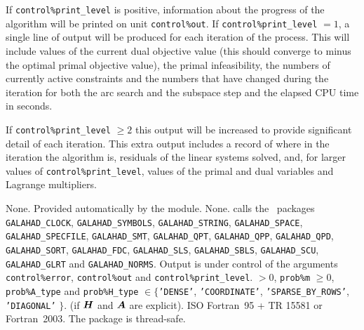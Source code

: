 \documentclass{galahad}
\newcommand{\packagename}{DQP}
\begin{document}
\galinfo
If {\tt control\%print\_level} is positive, information about the progress
of the algorithm will be printed on unit {\tt control\-\%out}.
If {\tt control\%print\_level} $= 1$, a single line of output will be produced
for each iteration of the process.
This will include values of the current dual objective value (this should
converge to minus the optimal primal objective value), the
primal infeasibility, the numbers of currently active constraints and the
numbers that have changed during the iteration for both the arc search and
the subspace step and the elapsed CPU time in seconds.

If {\tt control\%print\_level} $\geq 2$ this
output will be increased to provide significant detail of each iteration.
This extra output includes a record of where in the iteration the algorithm is,
residuals of the linear systems solved, and,
for larger values of {\tt control\%print\_level}, values of the primal and dual
variables and Lagrange multipliers.


\galgeneral

\galcommon None.
\galworkspace Provided automatically by the module.
\galroutines None.
\galmodules {\tt \packagename\_solve} calls the \galahad\ packages
{\tt GALAHAD\_CLOCK},
{\tt GALAHAD\_SY\-M\-BOLS},
{\tt GAL\-AHAD\-\_STRING},
{\tt GALAHAD\-\_SPACE},
{\tt GALAHAD\_SPECFILE},
{\tt GALAHAD\_SMT},
{\tt GALAHAD\_QPT},
{\tt GALAHAD\_QPP},
{\tt GALAHAD\_\-QPD},
{\tt GAL\-AHAD\_\-SORT},
{\tt GALAHAD\_\-FDC},
{\tt GALAHAD\_\-SLS},
{\tt GALAHAD\_\-SBLS},
{\tt GALAHAD\_\-SCU},
{\tt GALAHAD\-\_\-GLRT}
and
{\tt GALAHAD\-\_\-NORMS}.
\galio Output is under control of the arguments
 {\tt control\%error}, {\tt control\%out} and {\tt control\%print\_level}.
 $> 0$, {\tt prob\%m} $\geq  0$,
{\tt prob\%A\_type} and {\tt prob\%H\_type} $\in \{${\tt 'DENSE'},
 {\tt 'COORDINATE'}, {\tt 'SPARSE\_BY\_\-ROWS'}, {\tt 'DIAGONAL'} $\}$.
(if ${\bm{H}}$ and ${\bm{A}}$ are explicit).
\galportability ISO Fortran~95 + TR 15581 or Fortran~2003.
The package is thread-safe.

\end{document}
